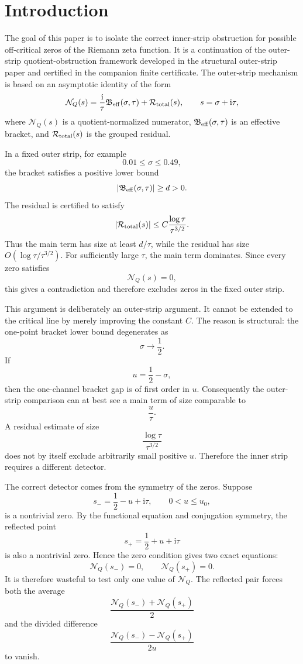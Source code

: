 \documentclass[11pt]{article}
\newcommand{\ii}{\mathrm{i}}
\newcommand{\NQ}{\mathcal N_Q}
\newcommand{\Rtot}{\mathcal R_{\rm total}}
\newcommand{\Beff}{\mathfrak B_{\rm eff}}
\begin{document}
\tableofcontents


\section{Introduction}
\label{sec:introduction}

The goal of this paper is to isolate the correct inner-strip obstruction for
possible off-critical zeros of the Riemann zeta function.  It is a continuation
of the outer-strip quotient-obstruction framework developed in the structural
outer-strip paper and certified in the companion finite certificate.  The
outer-strip mechanism is based on an asymptotic identity of the form
\[
        \NQ(s)
        =
        \frac{\ii}{\tau}\Beff(\sigma,\tau)
        +
        \Rtot(s),
        \qquad
        s=\sigma+\ii\tau,
\]
where \(\NQ(s)\) is a quotient-normalized numerator, \(\Beff(\sigma,\tau)\) is
an effective bracket, and \(\Rtot(s)\) is the grouped residual.

In a fixed outer strip, for example
\[
        0.01\le\sigma\le0.49,
\]
the bracket satisfies a positive lower bound
\[
        |\Beff(\sigma,\tau)|\ge d>0.
\]
The residual is certified to satisfy
\[
        |\Rtot(s)|
        \le
        C
        \frac{\log\tau}{\tau^{3/2}}.
\]
Thus the main term has size at least \(d/\tau\), while the residual has size
\(O(\log\tau/\tau^{3/2})\).  For sufficiently large \(\tau\), the main term
dominates.  Since every zero satisfies
\[
        \NQ(s)=0,
\]
this gives a contradiction and therefore excludes zeros in the fixed outer
strip.

This argument is deliberately an outer-strip argument.  It cannot be extended
to the critical line by merely improving the constant \(C\).  The reason is
structural: the one-point bracket lower bound degenerates as
\[
        \sigma\to\frac12.
\]
If
\[
        u=\frac12-\sigma,
\]
then the one-channel bracket gap is of first order in \(u\).  Consequently the
outer-strip comparison can at best see a main term of size comparable to
\[
        \frac{u}{\tau}.
\]
A residual estimate of size
\[
        \frac{\log\tau}{\tau^{3/2}}
\]
does not by itself exclude arbitrarily small positive \(u\).  Therefore the
inner strip requires a different detector.

The correct detector comes from the symmetry of the zeros.  Suppose
\[
        s_-=\frac12-u+\ii\tau,
        \qquad
        0<u\le u_0,
\]
is a nontrivial zero.  By the functional equation and conjugation symmetry,
the reflected point
\[
        s_+=\frac12+u+\ii\tau
\]
is also a nontrivial zero.  Hence the zero condition gives two exact equations:
\[
        \NQ(s_-)=0,
        \qquad
        \NQ(s_+)=0.
\]
It is therefore wasteful to test only one value of \(\NQ\).  The reflected pair
forces both the average
\[
        \frac{\NQ(s_-)+\NQ(s_+)}2
\]
and the divided difference
\[
        \frac{\NQ(s_-)-\NQ(s_+)}{2u}
\]
to vanish.
\end{document}
